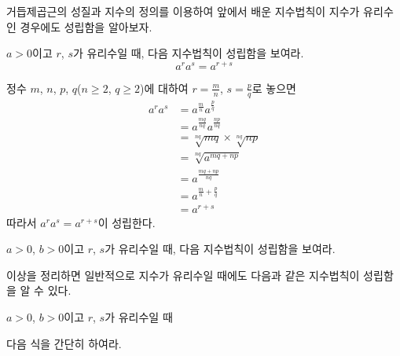\documentclass[11pt, a4paper]{book}
\begin{document}
거듭제곱근의 성질과 지수의 정의를 이용하여 앞에서 배운 지수법칙이 지수가 유리수인 경우에도 성립함을 알아보자.
\begin{example}
$a>0$이고 $r$, $s$가 유리수일 때, 다음 지수법칙이 성립함을 보여라.
\begin{equation*}
		a^{r} a^{s}= a^{r+s}
\end{equation*}	
\begin{solution}
	 정수 $m$, $n$, $p$, $q$($n \geq2$, $q \geq 2$)에 대하여 $r=\frac{m}{n}$, $s=\frac{p}{q}$로 놓으면
	\begin{align*}
	a^{r}a^{s} &= a^{\frac{m}{n}}a^{\frac{p}{q}}\\
					&= a^{\frac{mq}{nq}}a^{\frac{np}{nq}} \\
			   		&=\sqrt[nq]{mq}\times\sqrt[nq]{np}\\
			   		&=\sqrt[nq]{a^{mq+np}}\\
			        &= a^{\frac{mq+np}{nq}}\\
			        &= a^{\frac{m}{n}+\frac{p}{q}}\\
			        &= a^{r+s}
\end{align*}
	따라서 $a^{r}a^{s}= a^{r+s}$이 성립한다.
\end{solution}
	
\end{example}

\begin{problem}
	 $a>0$, $b>0$이고 $r$, $s$가 유리수일 때, 다음 지수법칙이 성립함을 보여라.
\end{problem}

이상을 정리하면 일반적으로 지수가 유리수일 때에도 다음과 같은 지수법칙이 성립함을 알 수 있다.

\begin{theorem}
	$a>0$, $b>0$이고 $r$, $s$가 유리수일 때
\end{theorem}
 \begin{sample}
 \end{sample}

\begin{problem}
	다음 식을 간단히 하여라.  
\end{problem}
 \vskip 10pt
 
\end{document}
